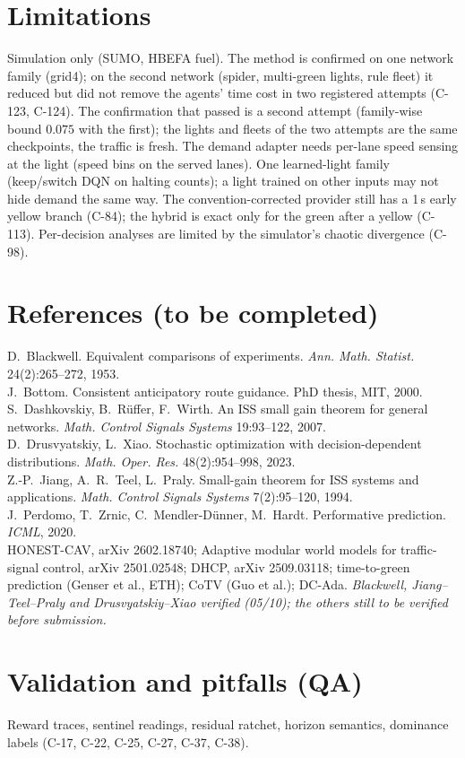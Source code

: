 \documentclass[11pt]{article}
\begin{document}
\section{Limitations}
Simulation only (SUMO, HBEFA fuel). The method is confirmed on one network family (grid4); on the second network (spider, multi-green
lights, rule fleet) it reduced but did not remove the agents' time cost in two registered attempts (C-123, C-124). The confirmation that passed is a second attempt (family-wise bound $0.075$ with the first); the lights
and fleets of the two attempts are the same checkpoints, the traffic is fresh. The demand adapter needs per-lane speed sensing at the light
(speed bins on the served lanes). One learned-light family (keep/switch DQN on halting counts); a light trained on other inputs may not
hide demand the same way. The convention-corrected provider still has a 1\,s early yellow branch (C-84); the hybrid is exact only for the
green after a yellow (C-113). Per-decision analyses are limited by the simulator's chaotic divergence (C-98).

\section*{References (to be completed)}
\small
D.~Blackwell. Equivalent comparisons of experiments. \emph{Ann. Math. Statist.} 24(2):265--272, 1953.\\
J.~Bottom. Consistent anticipatory route guidance. PhD thesis, MIT, 2000.\\
S.~Dashkovskiy, B.~R\"uffer, F.~Wirth. An ISS small gain theorem for general networks. \emph{Math. Control Signals Systems} 19:93--122, 2007.\\
D.~Drusvyatskiy, L.~Xiao. Stochastic optimization with decision-dependent distributions. \emph{Math. Oper. Res.} 48(2):954--998, 2023.\\
Z.-P.~Jiang, A.~R.~Teel, L.~Praly. Small-gain theorem for ISS systems and applications. \emph{Math. Control Signals Systems} 7(2):95--120, 1994.\\
J.~Perdomo, T.~Zrnic, C.~Mendler-D\"unner, M.~Hardt. Performative prediction. \emph{ICML}, 2020.\\
HONEST-CAV, arXiv 2602.18740; Adaptive modular world models for traffic-signal control, arXiv 2501.02548; DHCP, arXiv 2509.03118;
time-to-green prediction (Genser et al., ETH); CoTV (Guo et al.); DC-Ada. \emph{Blackwell, Jiang--Teel--Praly and Drusvyatskiy--Xiao verified (05/10); the others still to be verified before submission.}
\normalsize

\appendix
\section{Validation and pitfalls (QA)}
Reward traces, sentinel readings, residual ratchet, horizon semantics, dominance labels (C-17, C-22, C-25, C-27, C-37, C-38).
\end{document}
